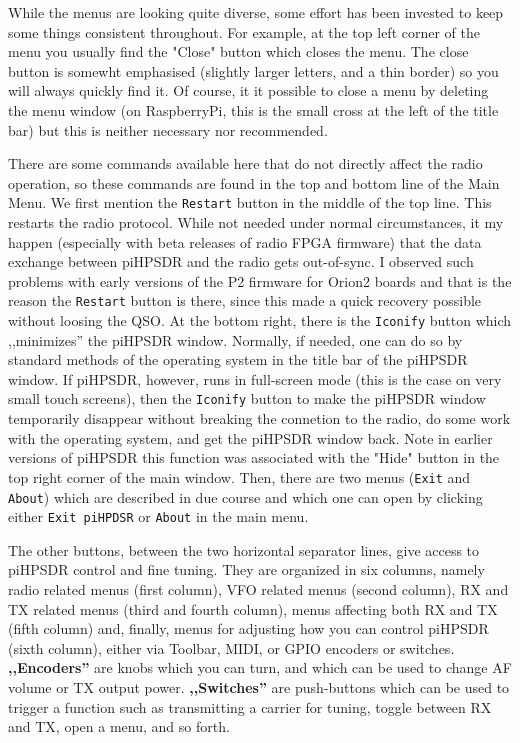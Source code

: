 \documentclass[12pt]{book}
\def\rett#1{\texttt{\color{red}#1}}
\def\bltt#1{\texttt{\color{blue}#1}}
\begin{document}
While the menus are looking quite diverse, some effort has been invested to keep
some things consistent throughout. For example, at the top left corner of the menu
you usually find the "Close" button which closes the menu. The close button is somewht
emphasised (slightly larger letters, and a thin border) so you will always quickly find it.
Of course, it it possible to close a menu by deleting the menu window (on RaspberryPi,
this is the small cross at the left of the title bar) but this is neither necessary nor
recommended.

There are some commands available here that do not directly affect the radio operation,
so these commands are found in the top and bottom line of the Main Menu. We first
mention the \rett{Restart} button in the middle of the top line. This restarts the
radio protocol. While not needed under normal circumstances, it my happen (especially
with beta releases of radio FPGA firmware) that the data exchange between piHPSDR and
the radio gets out-of-sync. I observed such problems with early versions of the P2
firmware for Orion2 boards and that is the reason the \rett{Restart} button is
there, since this made a quick recovery possible without loosing the QSO.
At the bottom right, there is the \rett{Iconify} button which ,,minimizes'' the
piHPSDR window. Normally, if needed, one can do so by standard methods of the
operating system in the title bar of the piHPSDR window. If piHPSDR, however,
runs in full-screen mode (this is the case on very small touch screens), then the
\rett{Iconify} button to make the piHPSDR window temporarily disappear without
breaking the connetion to the radio, do some work with the operating system, and
get the piHPSDR window back. Note in earlier versions of piHPSDR this function was
associated with the "Hide" button in the top right corner of the main window.
Then, there are two menus (\bltt{Exit} and \bltt{About}) which are described in due course and which
one can open by clicking either \rett{Exit piHPDSR} or \rett{About} in the main menu.

The other buttons, between the two horizontal separator lines, give access to piHPSDR
control and fine tuning. They are organized in six columns, namely radio related
menus (first column), VFO related menus (second column), RX and TX related menus (third
and fourth column), menus affecting both RX and TX (fifth column) and, finally,
menus for adjusting how you can control piHPSDR (sixth column), either via Toolbar,
MIDI, or GPIO encoders or switches. \textbf{,,Encoders''} are knobs which you can turn, and which
can be used to change AF volume or TX output power. \textbf{,,Switches''} are push-buttons which
can be used to trigger a function such as transmitting a carrier for tuning, toggle
between RX and TX, open a menu, and so forth.
\end{document}
